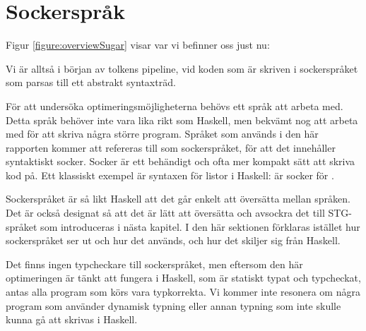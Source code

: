 \documentclass[Rapport]{subfiles}
\begin{document}
\section{Sockerspråk}
\label{sec:Socker}

%
%
%
%
%
%
%

%




Figur \ref{figure:overviewSugar} visar var vi befinner oss just nu:

\overviewSugar

Vi är alltså i början av tolkens pipeline, vid koden som är skriven i sockerspråket
som parsas till ett abstrakt syntaxträd.

För att undersöka optimeringsmöjligheterna behövs ett språk att arbeta med. 
Detta språk behöver inte vara lika rikt som Haskell, men bekvämt nog
att arbeta med för att skriva några större program. Språket som används i den
här rapporten kommer att refereras till som sockerspråket, för att det 
innehåller syntaktiskt socker. Socker är ett behändigt och ofta mer kompakt sätt 
att skriva kod på. Ett klassiskt exempel är syntaxen
för listor i Haskell: \miniCode{[5,0,4]} är socker för .

Sockerspråket är så likt Haskell att det går enkelt att översätta mellan språken.
Det är också designat så att det är lätt att översätta och avsockra det till 
STG-språket som introduceras i nästa kapitel. I den här sektionen
förklaras istället hur sockerspråket ser ut och hur det används, och hur
det skiljer sig från Haskell.

Det finns ingen typcheckare till sockerspråket, men eftersom den här optimeringen
är tänkt att fungera i Haskell, som är statiskt typat och typcheckat, antas
alla program som körs vara typkorrekta. Vi kommer inte resonera om några program
som använder dynamisk typning eller annan typning som inte skulle kunna gå
att skrivas i Haskell.
\end{document}
